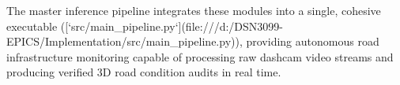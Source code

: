 The master inference pipeline integrates these modules into a single, cohesive executable ([`src/main_pipeline.py`](file:///d:/DSN3099-EPICS/Implementation/src/main_pipeline.py)), providing autonomous road infrastructure monitoring capable of processing raw dashcam video streams and producing verified 3D road condition audits in real time.
